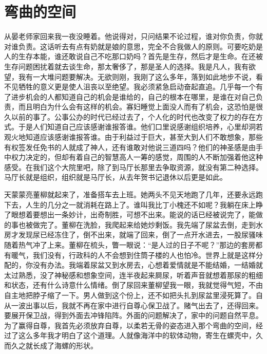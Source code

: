 \documentclass[12pt,oneside]{book}
\begin{document}
\chapter{弯曲的空间}

从晏老师家回来我一夜没睡着。他说得对，只问结果不论过程，谁对你负责，你就对谁负责。这话听去有点有奶就是娘的意思，完全不合我做人的原则。可要吃奶是人的生存本能，谁还敢说自己不吃那口奶吗？首先是生存，然后才是生命。在还被生存问题困扰着就去谈生命，那太奢侈了，那是圣人的选择。我是凡人，我有欲望，我有一大堆问题要解决。无欲则刚，我刚了这么多年，落到如此地步不说，看不见牺牲的意义更是使人沮丧以至绝望。我必须紧急启动奋起直追。几乎每一个有了进步机会的人都知道自己的机会是谁给的，自己的根本在哪里，是谁在对自己负责，而且明白为什么会有这样的机会。寡妇睡觉上面没人而有了机会，这恐怕是很久以前的事了。公事公办的时代已经过去了，个人化的时代也改变了权力的存在方式。于是人们知道自己应该感谢谁报答谁。他们口里说感谢组织培养，心里却洞若观火地知道应该感谢谁报答谁。由于利益过于巨大，甚至大到人们不敢想象，那些有权签发任免书的人就成了神人，还有谁敢对他说三道四吗？他们的神圣感是由手中权力决定的，但却有着自己的智慧高人一筹的感觉，周围的人不断加强着他这种感受。在我们这个大院里吧，除了到马厅长那里去争取资源，就没有第二种选择。马厅长就是组织，组织就是马厅长，从去年贺书记退休以后更是如此。

天蒙蒙亮董柳就起来了，准备搭车去上班。她两头不见天地跑了几年，还要永远跑下去，人生的几分之一就消耗在路上了。谁叫我比丁小槐还不如呢？我躺在床上睁了眼想着要想出一条妙计，出奇制胜，可想不出来。能说的话已经被说完了，能做的事也被做完了。董柳在洗脸，我爬起来给她炒剩饭。我先端了尿盆去倒，走到水房才发现尿已经冻住了，倒不出来，就端了回来，倒了一点开水进去，一股尿骚味随着热气冲了上来。董柳在梳头，瞥一眼说：``是人过的日子不呢？''那边的套房都有暖气，我们没有，行政科的人不会想到住筒子楼的人也怕冷。世界上就是这样分配的，你没有办法。我端着尿盆又到水房去，心想着爱情就是不能结婚，一结婚就太过熟悉，没了神秘感和想象空间，连半夜起来屙尿，听着声音就想着那尿的粗细和状态，还有什么诗意什么情绪。倒了尿回来董柳望我一眼，我就觉得气短，不由自主地把脖子缩了一下。男人做到这个份上，还不如把头扎到尿盆里浸死算了。自从一波出事以后，我就不再在家中进行自尊心保卫战了。赌气出去了，还得回来。要展开保卫战，得到外面去冲锋陷阵。外面的问题解决了，家中的问题自然平息。为了赢得自尊，我首先必须放弃自尊，以柔若无骨的姿态进入那个弯曲的空间，经过了这么多年我才明白了这个道理。人就像海洋中的软体动物，寄生在螺壳中，久而久之就长成了海螺的形状。
\end{document}
